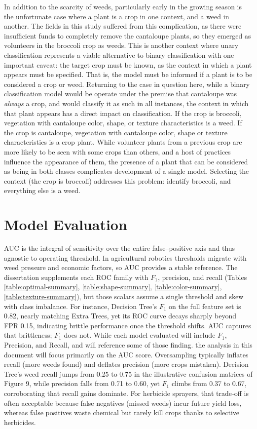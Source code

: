 \documentclass[letterpaper, notitlepage]{report}
\begin{document}
In addition to the scarcity of weeds, particularly early in the growing season is the unfortunate case where a plant is a crop in one context, and a weed in another. The fields in this study suffered from this complication, as there were insufficient funds to completely remove the cantaloupe plants, so they emerged as volunteers in the broccoli crop as weeds. This is another context where unary classification represents a viable alternative to binary classification with one important caveat: the target crop must be known, as the context in which a plant appears must be specified. That is, the model must be informed if a plant is to be considered a crop or weed. Returning to the case in question here, while a binary classification model would be operate under the premise that cantaloupe was \textit{always} a crop, and would classify it as such in all instances, the context in which that plant appears has a direct impact on classification.  If the crop is broccoli, vegetation with cantaloupe color, shape, or texture characteristics is a weed. If the crop is cantaloupe, vegetation with cantaloupe color, shape or texture characteristics is a crop plant. While volunteer plants from a previous crop are more likely to be seen with some crops than others, and a host of practices influence the appearance of them, the presence of a plant that can be considered as being in both classes complicates development of a single model. Selecting the context (the crop is broccoli) addresses this problem: identify broccoli, and everything else is a weed.

\section{Model Evaluation}
AUC is the integral of sensitivity over the entire false–positive axis and thus agnostic to operating threshold.
In agricultural robotics thresholds migrate with weed pressure and economic factors, so AUC provides a
stable reference. The dissertation supplements each ROC family with $F_{1}$, precision, and recall (Tables \ref{table:optimal-summary}, \ref{table:shape-summary}, \ref{table:color-summary}, \ref{table:texture-summary}), but those scalars assume a single threshold and skew with class imbalance. For instance,
Decision Tree’s $F_{1}$ on the full feature set is 0.82, nearly matching Extra Trees, yet its ROC curve decays
sharply beyond FPR 0.15, indicating brittle performance once the threshold shifts. AUC captures that
brittleness; $F_{1}$ does not. While each model evaluated will include $F_{1}$, Precision, and Recall, and will reference some of those finding. the analysis in this document will focus primarily on the \gls{AUC} score. Oversampling typically inflates recall (more weeds found) and deflates precision (more crops mistaken). Decision Tree’s weed recall jumps from 0.25 to 0.75 in the illustrative confusion matrices of Figure 9, while precision falls from 0.71 to 0.60, yet $F_{1}$ climbs from 0.37 to 0.67, corroborating that recall gains dominate. For herbicide sprayers, that trade‑off is often acceptable because false negatives (missed weeds) incur future yield loss, whereas false positives waste chemical but rarely kill crops thanks to selective herbicides.
\end{document}
